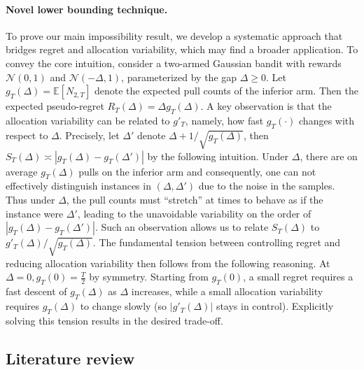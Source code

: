 \documentclass[nonblindrev]{informs3_noinforms}
\begin{document}
\paragraph{Novel lower bounding technique.}
To prove our main impossibility result, we develop a systematic approach that bridges regret and allocation variability, which may find a broader application. To convey the core intuition, consider a two-armed Gaussian bandit with rewards $\mathcal{N}(0,1)$ and $\mathcal{N}(-\Delta,1)$, parameterized by the gap $\Delta\geq 0$. Let $g_T(\Delta) = \mathbb{E}[N_{2, T}]$ denote the expected pull counts of the inferior arm. Then the expected pseudo-regret $R_T(\Delta) = \Delta g_T(\Delta)$. A key observation is that the allocation variability can be related to $g'_T$, namely, how fast $g_T(\cdot)$ changes with respect to $\Delta$. Precisely, let $\Delta'$ denote $\Delta+1/\sqrt{g_T(\Delta)}$, then $S_T(\Delta) \asymp \left|g_T(\Delta) - g_T\left(\Delta'\right)\right|$ by the following intuition. Under $\Delta$, there are on average $g_T(\Delta)$ pulls on the inferior arm and consequently, one can not effectively distinguish instances in $\left(\Delta, \Delta'\right)$ due to the noise in the samples. Thus under $\Delta$, the pull counts must ``stretch'' at times to behave as if the instance were $\Delta'$, leading to the unavoidable variability on the order of $\left|g_T(\Delta) - g_T\left(\Delta'\right)\right|$. Such an observation allows us to relate $S_T(\Delta)$ to ${g'_T(\Delta)}/{\sqrt{g_T(\Delta)}}$. The fundamental tension between controlling regret and reducing allocation variability then follows from the following reasoning. At $\Delta = 0, g_T(0) = \frac{T}{2}$ by symmetry. Starting from $g_T(0)$, a small regret requires a fast descent of $g_T(\Delta)$ as $\Delta$ increases, while a small allocation variability requires $g_T(\Delta)$ to change slowly (so $|g'_T(\Delta)|$ stays in control). Explicitly solving this tension results in the desired trade-off.



\subsection{Literature review}\label{sec:literature_review}
\end{document}
